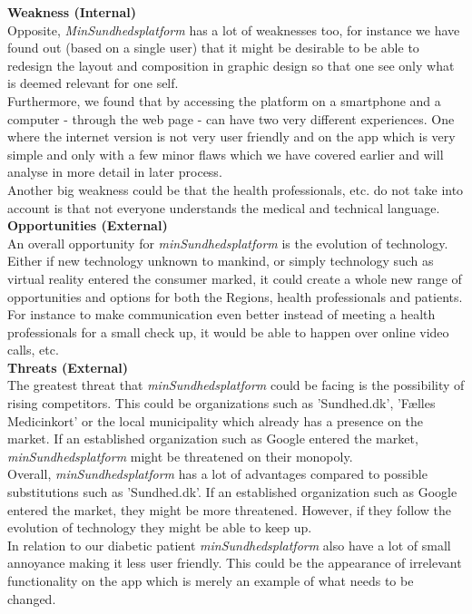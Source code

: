 \documentclass[a4paper,11pt]{article}
\begin{document}
\textbf{Weakness (Internal)}\\
Opposite, \textit{MinSundhedsplatform} has a lot of weaknesses too, for instance we have found out (based on a single user) that it might be desirable to be able to redesign the layout and composition in graphic design so that one see only what is deemed relevant for one self.\\ 

Furthermore, we found that by accessing the platform on a smartphone and a computer - through the web page - can have two very different experiences. One where the internet version is not very user friendly and on the app which is very simple and only with a few minor flaws which we have covered earlier and will analyse in more detail in later process.\\

Another big weakness could be that the health professionals, etc. do not take into account is that not everyone understands the medical and technical language.\\

\textbf{Opportunities (External)}\\
An overall opportunity for \textit{minSundhedsplatform} is the evolution of technology. Either if new technology unknown to mankind, or simply technology such as virtual reality entered the consumer marked, it could create a whole new range of opportunities and options for both the Regions, health professionals and patients. For instance to make communication even better instead of meeting a health professionals for a small check up, it would be able to happen over online video calls, etc.\\

\textbf{Threats (External)}\\
The greatest threat that \textit{minSundhedsplatform} could be facing is the possibility of rising competitors. This could be organizations such as 'Sundhed.dk', 'Fælles Medicinkort' or the local municipality which already has a presence on the market.
If an established organization such as Google entered the market, \textit{minSundhedsplatform} might be threatened on their monopoly.\\

Overall, \textit{minSundhedsplatform} has a lot of advantages compared to possible substitutions such as 'Sundhed.dk'. If an established organization such as Google entered the market, they might be more threatened. However, if they follow the evolution of technology they might be able to keep up.\\ In relation to our diabetic patient \textit{minSundhedsplatform} also have a lot of small annoyance making it less user friendly. This could be the appearance of irrelevant functionality on the app which is merely an example of what needs to be changed.
\end{document}
